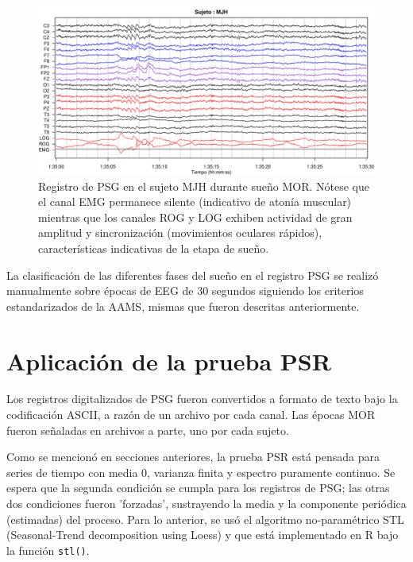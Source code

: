 \begin{figure}
\centering
\includegraphics[width=\linewidth]
{./img_ejemplos/MJH_190_PDG_lucirse_PSG.pdf}
\caption{Registro de PSG en el sujeto MJH durante sue\~no MOR. N\'otese que el canal EMG permanece 
silente (indicativo de aton\'ia muscular) mientras que los canales ROG y LOG exhiben actividad de 
gran amplitud y sincronizaci\'on (movimientos oculares r\'apidos), caracter\'isticas indicativas de
la etapa de sue\~no.}
\label{ejemplos_mor}
\end{figure}

La clasificaci\'on de las diferentes fases del sue\~no en el registro PSG se realiz\'o manualmente 
sobre \'epocas de EEG de 30 segundos siguiendo los criterios 
estandarizados de la AAMS\cite{Hori01}, mismas que fueron descritas anteriormente.


\section{Aplicaci\'on de la prueba PSR}

Los registros digitalizados de PSG fueron convertidos a formato de texto bajo la codificaci\'on 
ASCII, a raz\'on de un archivo por cada canal. 
Las \'epocas MOR fueron se\~naladas en archivos a parte, uno por cada sujeto.

Como se mencion\'o en secciones anteriores, la prueba PSR est\'a pensada para series de tiempo con 
media 0, varianza finita y espectro puramente continuo. Se espera que la segunda condici\'on se 
cumpla para los registros de PSG; las otras dos condiciones fueron 'forzadas', sustrayendo la media 
y la componente peri\'odica (estimadas) del proceso.
Para lo anterior, se us\'o el algoritmo no-param\'etrico STL (Seasonal-Trend decomposition using 
Loess) \cite{Cleveland1990} y que est\'a implementado en R bajo la funci\'on \texttt{stl()}.


